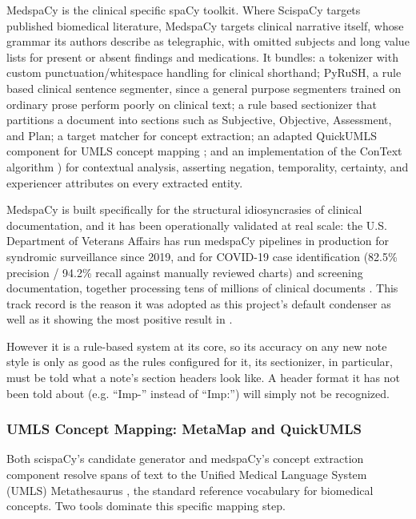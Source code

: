\documentclass[11pt,a4paper]{article}
\begin{document}
MedspaCy \cite{eyre2021launching} is the clinical specific spaCy toolkit. Where ScispaCy targets published biomedical literature, MedspaCy targets clinical narrative itself, whose grammar its authors describe as telegraphic, with omitted subjects and long value lists for present or absent findings and medications. It bundles: a tokenizer with custom punctuation/whitespace handling for clinical shorthand; PyRuSH, a rule based clinical sentence segmenter, since a general purpose segmenters trained on ordinary prose perform poorly on clinical text; a rule based sectionizer that partitions a document into sections such as Subjective, Objective, Assessment, and Plan; a target matcher for concept extraction; an adapted QuickUMLS component for UMLS concept mapping ; and an implementation of the ConText algorithm \cite{harkema2009context} ) for contextual analysis, asserting negation, temporality, certainty, and experiencer attributes on every extracted entity. 

MedspaCy is built specifically for the structural idiosyncrasies of clinical documentation, and it has been operationally validated at real scale: the U.S. Department of Veterans Affairs has run medspaCy pipelines in production for syndromic surveillance since 2019, and for COVID-19 case identification (82.5\% precision / 94.2\% recall against manually reviewed charts) and screening documentation, together processing tens of millions of clinical documents \cite{eyre2021launching} . This track record is the  reason it was adopted as this project's default condenser as well as it showing the most positive result in . 

However it is a rule-based system at its core, so its accuracy on any new note style is only as good as the rules configured for it,  its sectionizer, in particular, must be told what a note's section headers look like. A header format it has not been told about (e.g. “Imp-” instead of “Imp:”) will simply not be recognized. 

\subsubsection{UMLS Concept Mapping: MetaMap and QuickUMLS}
\label{sec:UMLS Concept Mapping: MetaMap and QuickUMLS}

Both scispaCy's candidate generator and medspaCy's concept extraction component  resolve spans of text to the Unified Medical Language System (UMLS) Metathesaurus \cite{bodenreider2004unified} , the standard reference vocabulary for biomedical concepts. Two tools dominate this specific mapping step. 
\end{document}
